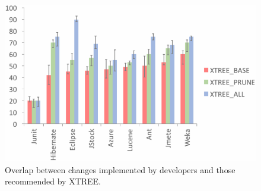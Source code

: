 \begin{figure}[t]
\centering
\includegraphics[width=\linewidth]{rq3.png}
\caption{Overlap between changes implemented by developers and those 
recommended by XTREE.}
\label{fig:rq1}
\end{figure}